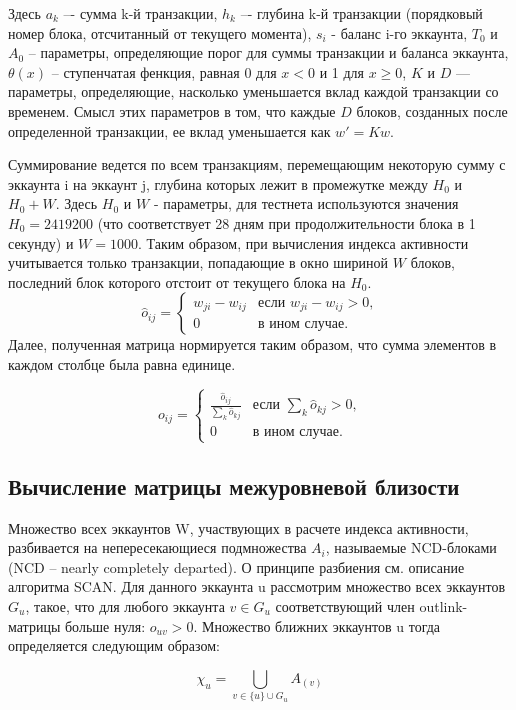 \documentclass[a4paper,12pt]{article}
\begin{document}
Здесь $a_k$ –- сумма k-й транзакции, $h_k$ –- глубина  k-й транзакции (порядковый номер блока, отсчитанный от текущего момента), $s_i$ - баланс i-го эккаунта, $T_0$ и $A_0$ -- параметры, определяющие порог для суммы транзакции и баланса эккаунта, $\theta(x)$ -- ступенчатая фенкция, равная 0 для $x<0$ и 1 для $x \ge 0$, $K$ и  $D$ — параметры, определяющие, насколько уменьшается вклад каждой транзакции со временем. Смысл этих параметров в том, что каждые $D$ блоков, созданных после определенной транзакции, ее вклад уменьшается как $w'=Kw$.

Суммирование ведется по всем транзакциям, перемещающим некоторую сумму с эккаунта i на эккаунт j, глубина которых лежит в промежутке между $H_0$ и $H_0+W$. Здесь $H_0$ и $W$ - параметры, для тестнета используются значения $H_0=2419200$ (что соответствует 28 дням при продолжительности блока в 1 секунду) и $W=1000$. Таким образом, при вычисления индекса активности учитывается только транзакции, попадающие в окно шириной $W$ блоков, последний блок которого отстоит от текущего блока на $H_0$.
$$
\hat{o}_{ij} = \begin{cases}
 w_{ji}-w_{ij}
 & \text{если $w_{ji}-w_{ij} > 0$,}\\
 0 & \text{в ином случае.}
\end{cases}
$$
Далее, полученная матрица нормируется таким образом, что сумма элементов в каждом столбце была равна единице. 

$$
o_{ij} = \begin{cases}
 \frac{\hat{o}_{ij}} {\sum\limits_{k} \hat{o}_{kj}}
 & \text{если $\sum\limits_{k} \hat{o}_{kj}> 0$,}\\
 0 & \text{в ином случае.}
\end{cases} 
$$

\subsection{Вычисление матрицы межуровневой близости}

Множество всех эккаунтов W, участвующих в расчете индекса активности, разбивается на непересекающиеся подмножества $A_i$, называемые NCD-блоками (NCD – nearly completely departed). О принципе разбиения см. описание алгоритма SCAN. 
Для данного эккаунта u рассмотрим множество всех эккаунтов $G_u$, такое, что для любого эккаунта $v \in G_u$ соответствующий член outlink-матрицы больше нуля: $o_{uv} > 0$. Множество ближних эккаунтов u тогда определяется следующим образом:

$$
\chi_u = \bigcup_{v \in \{u\} \cup G_u} A_{(v)}
$$
\end{document}
